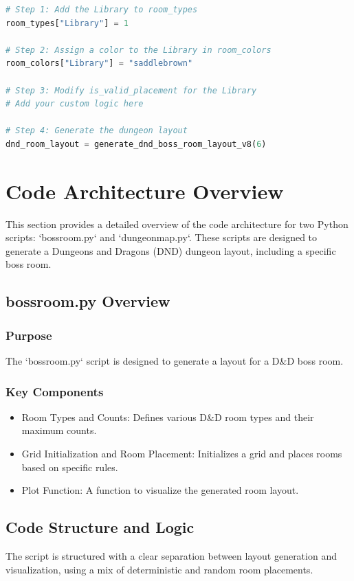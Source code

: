\documentclass[10pt,twocolumn]{article}
\begin{document}
\begin{lstlisting}[language=Python]
# Step 1: Add the Library to room_types
room_types["Library"] = 1

# Step 2: Assign a color to the Library in room_colors
room_colors["Library"] = "saddlebrown"

# Step 3: Modify is_valid_placement for the Library
# Add your custom logic here

# Step 4: Generate the dungeon layout
dnd_room_layout = generate_dnd_boss_room_layout_v8(6)
\end{lstlisting}



\section{Code Architecture Overview}

This section provides a detailed overview of the code architecture for two Python scripts: `bossroom.py` and `dungeonmap.py`. These scripts are designed to generate a Dungeons and Dragons (DND) dungeon layout, including a specific boss room.

\subsection{bossroom.py Overview}
\subsubsection{Purpose}
The `bossroom.py` script is designed to generate a layout for a D\&D boss room. 

\subsubsection{Key Components}
\begin{itemize}
    \item Room Types and Counts: Defines various D\&D room types and their maximum counts.
    \item Grid Initialization and Room Placement: Initializes a grid and places rooms based on specific rules.
    \item Plot Function: A function to visualize the generated room layout.
\end{itemize}

\subsection{Code Structure and Logic}
The script is structured with a clear separation between layout generation and visualization, using a mix of deterministic and random room placements.
\end{document}
